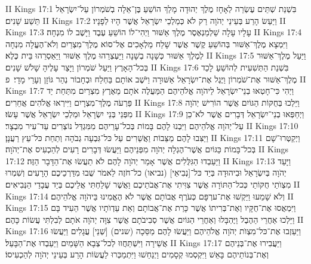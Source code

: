 II Kings 17:1	בִּשְׁנַת שְׁתֵּים עֶשְׂרֵה לְאָחָז מֶלֶךְ יְהוּדָה מָלַךְ הוֹשֵׁעַ בֶּן־אֵלָה בְשֹׁמְרוֹן עַל־יִשְׂרָאֵל תֵּשַׁע שָׁנִים׃
II Kings 17:2	וַיַּעַשׂ הָרַע בְּעֵינֵי יְהֹוָה רַק לֹא כְּמַלְכֵי יִשְׂרָאֵל אֲשֶׁר הָיוּ לְפָנָיו׃
II Kings 17:3	עָלָיו עָלָה שַׁלְמַנְאֶסֶר מֶלֶךְ אַשּׁוּר וַיְהִי־לוֹ הוֹשֵׁעַ עֶבֶד וַיָּשֶׁב לוֹ מִנְחָה׃
II Kings 17:4	וַיִּמְצָא מֶלֶךְ־אַשּׁוּר בְּהוֹשֵׁעַ קֶשֶׁר אֲשֶׁר שָׁלַח מַלְאָכִים אֶל־סוֹא מֶלֶךְ־מִצְרַיִם וְלֹא־הֶעֱלָה מִנְחָה לְמֶלֶךְ אַשּׁוּר כְּשָׁנָה בְשָׁנָה וַיַּעְצְרֵהוּ מֶלֶךְ אַשּׁוּר וַיַּאַסְרֵהוּ בֵּית כֶּלֶא׃
II Kings 17:5	וַיַּעַל מֶלֶךְ־אַשּׁוּר בְּכל־הָאָרֶץ וַיַּעַל שֹׁמְרוֹן וַיָּצַר עָלֶיהָ שָׁלֹשׁ שָׁנִים׃
II Kings 17:6	בִּשְׁנַת הַתְּשִׁעִית לְהוֹשֵׁעַ לָכַד מֶלֶךְ־אַשּׁוּר אֶת־שֹׁמְרוֹן וַיֶּגֶל אֶת־יִשְׂרָאֵל אַשּׁוּרָה וַיֹּשֶׁב אוֹתָם בַּחְלַח וּבְחָבוֹר נְהַר גּוֹזָן וְעָרֵי מָדָי׃ {פ}
II Kings 17:7	וַיְהִי כִּי־חָטְאוּ בְנֵי־יִשְׂרָאֵל לַיהֹוָה אֱלֹהֵיהֶם הַמַּעֲלֶה אֹתָם מֵאֶרֶץ מִצְרַיִם מִתַּחַת יַד פַּרְעֹה מֶלֶךְ־מִצְרָיִם וַיִּירְאוּ אֱלֹהִים אֲחֵרִים׃
II Kings 17:8	וַיֵּלְכוּ בְּחֻקּוֹת הַגּוֹיִם אֲשֶׁר הוֹרִישׁ יְהֹוָה מִפְּנֵי בְּנֵי יִשְׂרָאֵל וּמַלְכֵי יִשְׂרָאֵל אֲשֶׁר עָשׂוּ׃
II Kings 17:9	וַיְחַפְּאוּ בְנֵי־יִשְׂרָאֵל דְּבָרִים אֲשֶׁר לֹא־כֵן עַל־יְהֹוָה אֱלֹהֵיהֶם וַיִּבְנוּ לָהֶם בָּמוֹת בְּכל־עָרֵיהֶם מִמִּגְדַּל נוֹצְרִים עַד־עִיר מִבְצָר׃
II Kings 17:10	וַיַּצִּבוּ לָהֶם מַצֵּבוֹת וַאֲשֵׁרִים עַל כּל־גִּבְעָה גְבֹהָה וְתַחַת כּל־עֵץ רַעֲנָן׃
II Kings 17:11	וַיְקַטְּרוּ־שָׁם בְּכל־בָּמוֹת כַּגּוֹיִם אֲשֶׁר־הֶגְלָה יְהֹוָה מִפְּנֵיהֶם וַיַּעֲשׂוּ דְּבָרִים רָעִים לְהַכְעִיס אֶת־יְהֹוָה׃
II Kings 17:12	וַיַּעַבְדוּ הַגִּלֻּלִים אֲשֶׁר אָמַר יְהֹוָה לָהֶם לֹא תַעֲשׂוּ אֶת־הַדָּבָר הַזֶּה׃
II Kings 17:13	וַיָּעַד יְהֹוָה בְּיִשְׂרָאֵל וּבִיהוּדָה בְּיַד כּל־[נְבִיאֵי] (נביאו) כל־חֹזֶה לֵאמֹר שֻׁבוּ מִדַּרְכֵיכֶם הָרָעִים וְשִׁמְרוּ מִצְוֺתַי חֻקּוֹתַי כְּכל־הַתּוֹרָה אֲשֶׁר צִוִּיתִי אֶת־אֲבֹתֵיכֶם וַאֲשֶׁר שָׁלַחְתִּי אֲלֵיכֶם בְּיַד עֲבָדַי הַנְּבִיאִים׃
II Kings 17:14	וְלֹא שָׁמֵעוּ וַיַּקְשׁוּ אֶת־ערְפָּם כְּעֹרֶף אֲבוֹתָם אֲשֶׁר לֹא הֶאֱמִינוּ בַּיהֹוָה אֱלֹהֵיהֶם׃
II Kings 17:15	וַיִּמְאֲסוּ אֶת־חֻקָּיו וְאֶת־בְּרִיתוֹ אֲשֶׁר כָּרַת אֶת־אֲבוֹתָם וְאֵת עֵדְוֺתָיו אֲשֶׁר הֵעִיד בָּם וַיֵּלְכוּ אַחֲרֵי הַהֶבֶל וַיֶּהְבָּלוּ וְאַחֲרֵי הַגּוֹיִם אֲשֶׁר סְבִיבֹתָם אֲשֶׁר צִוָּה יְהֹוָה אֹתָם לְבִלְתִּי עֲשׂוֹת כָּהֶם׃
II Kings 17:16	וַיַּעַזְבוּ אֶת־כּל־מִצְוֺת יְהֹוָה אֱלֹהֵיהֶם וַיַּעֲשׂוּ לָהֶם מַסֵּכָה (שנים) [שְׁנֵי] עֲגָלִים וַיַּעֲשׂוּ אֲשֵׁירָה וַיִּשְׁתַּחֲווּ לְכל־צְבָא הַשָּׁמַיִם וַיַּעַבְדוּ אֶת־הַבָּעַל׃
II Kings 17:17	וַיַּעֲבִירוּ אֶת־בְּנֵיהֶם וְאֶת־בְּנוֹתֵיהֶם בָּאֵשׁ וַיִּקְסְמוּ קְסָמִים וַיְנַחֵשׁוּ וַיִּתְמַכְּרוּ לַעֲשׂוֹת הָרַע בְּעֵינֵי יְהֹוָה לְהַכְעִיסוֹ׃
